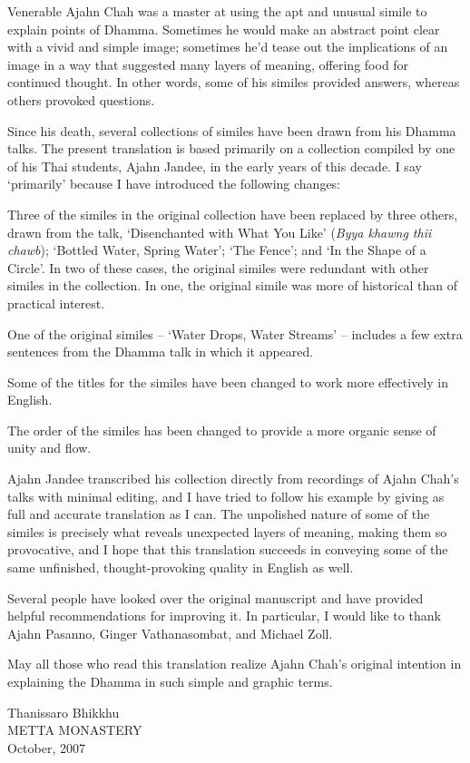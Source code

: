 
Venerable Ajahn Chah was a master at using the apt and unusual simile to explain points of Dhamma. Sometimes he would make an abstract point clear with a vivid and simple image; sometimes he'd tease out the implications of an image in a way that suggested many layers of meaning, offering food for continued thought. In other words, some of his similes provided answers, whereas others provoked questions. 

Since his death, several collections of similes have been drawn from his Dhamma talks. The present translation is based primarily on a collection compiled by one of his Thai students, Ajahn Jandee, in the early years of this decade. I say `primarily' because I have introduced the following changes: 

Three of the similes in the original collection have been replaced by three others, drawn from the talk, `Disenchanted with What You Like' (\textit{Byya khawng thii chawb}); `Bottled Water, Spring Water'; `The Fence'; and `In the Shape of a Circle'. In two of these cases, the original similes were redundant with other similes in the collection. In one, the original simile was more of historical than of practical interest. 

One of the original similes -- `Water Drops, Water Streams' -- includes a few extra sentences from the Dhamma talk in which it appeared.

Some of the titles for the similes have been changed to work more effectively in English.

The order of the similes has been changed to provide a more organic sense of unity and flow.

Ajahn Jandee transcribed his collection directly from recordings of Ajahn Chah's talks with minimal editing, and I have tried to follow his example by giving as full and accurate translation as I can. The unpolished nature of some of the similes is precisely what reveals unexpected layers of meaning, making them so provocative, and I hope that this translation succeeds in conveying some of the same unfinished, thought-provoking quality in English as well. 

Several people have looked over the original manuscript and have provided helpful recommendations for improving it. In particular, I would like to thank Ajahn Pasanno, Ginger Vathanasombat, and Michael Zoll.

May all those who read this translation realize Ajahn Chah's original intention in explaining the Dhamma in such simple and graphic terms.
\bigskip

{\par\raggedleft\noindent Thanissaro Bhikkhu \\
METTA MONASTERY \\
October, 2007 \par}

